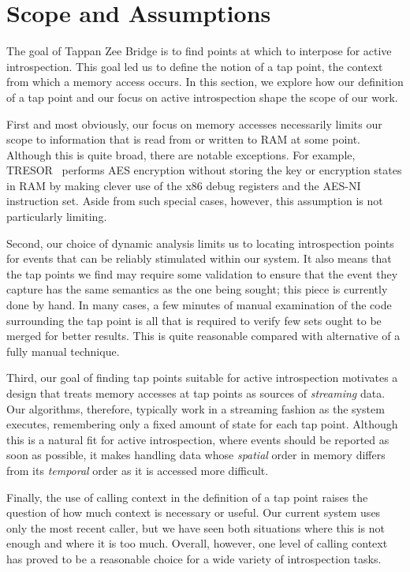 \section{Scope and Assumptions}
\label{sec:scope}

The goal of Tappan Zee Bridge is to find points at which to interpose
for active introspection. This goal led us to define the notion of a tap
point, the context from which a memory access occurs. In this section,
we explore how our definition of a tap point and our focus on active
introspection shape the scope of our work.

First and most obviously, our focus on memory accesses necessarily
limits our scope to information that is read from or written to RAM at
some point. Although this is quite broad, there are notable exceptions.
For example, TRESOR~\cite{Muller:2011} performs AES encryption without
storing the key or encryption states in RAM by making clever use of the
x86 debug registers and the AES-NI instruction set. Aside from such
special cases, however, this assumption is not particularly limiting.

Second, our choice of dynamic analysis limits us to locating
introspection points for events that can be reliably stimulated within
our system. It also means that the tap points we find may require some
validation to ensure that the event they capture has the same semantics
as the one being sought; this piece is currently done by hand.
In many cases, a few minutes of manual examination of the code
surrounding the tap point is all that is required to verify few sets
ought to be merged for better results. This is quite reasonable
compared with alternative of a fully manual technique.

Third, our goal of finding tap points suitable for active introspection
motivates a design that treats memory accesses at tap points as sources
of \emph{streaming} data. Our algorithms, therefore, typically work in a
streaming fashion as the system executes, remembering only a fixed
amount of state for each tap point. Although this is a natural fit for
active introspection, where events should be reported as soon as
possible, it makes handling data whose \emph{spatial} order in memory
differs from its \emph{temporal} order as it is accessed more difficult.

Finally, the use of calling context in the definition of a tap point
raises the question of how much context is necessary or useful. Our
current system uses only the most recent caller, but we have seen
both situations where this is not enough and where it is too much.
Overall, however, one level of calling context has proved to be a
reasonable choice for a wide variety of introspection tasks.

